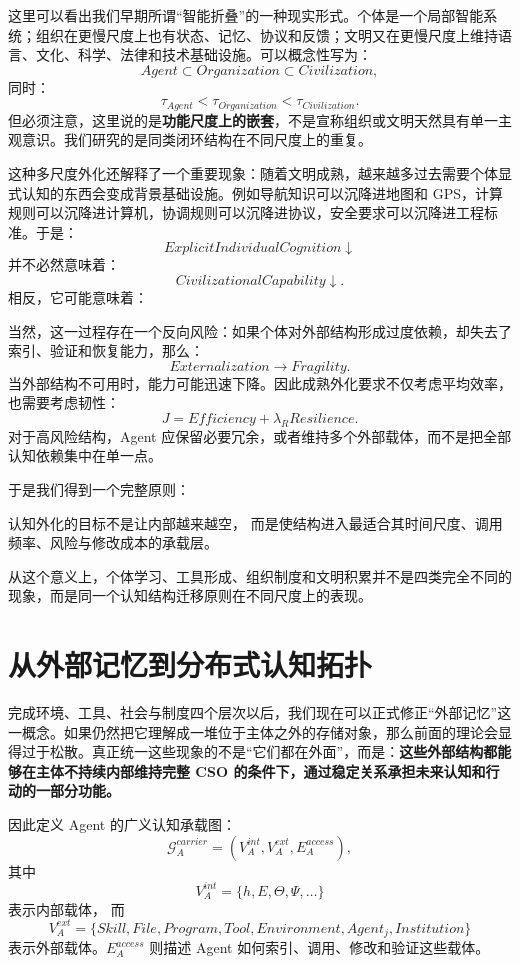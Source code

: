 这里可以看出我们早期所谓``智能折叠''的一种现实形式。个体是一个局部智能系统；组织在更慢尺度上也有状态、记忆、协议和反馈；文明又在更慢尺度上维持语言、文化、科学、法律和技术基础设施。可以概念性写为：
\[
Agent
\subset
Organization
\subset
Civilization,
\]
同时：
\[
\tau_{Agent}
<
\tau_{Organization}
<
\tau_{Civilization}.
\]
但必须注意，这里说的是\textbf{功能尺度上的嵌套}，不是宣称组织或文明天然具有单一主观意识。我们研究的是同类闭环结构在不同尺度上的重复。

这种多尺度外化还解释了一个重要现象：随着文明成熟，越来越多过去需要个体显式认知的东西会变成背景基础设施。例如导航知识可以沉降进地图和 GPS，计算规则可以沉降进计算机，协调规则可以沉降进协议，安全要求可以沉降进工程标准。于是：
\[
ExplicitIndividualCognition
\downarrow
\]
并不必然意味着：
\[
CivilizationalCapability
\downarrow.
\]
相反，它可能意味着：
\begin{statementbox}
\centering
{}
\end{statementbox}

当然，这一过程存在一个反向风险：如果个体对外部结构形成过度依赖，却失去了索引、验证和恢复能力，那么：
\[
Externalization
\rightarrow
Fragility.
\]
当外部结构不可用时，能力可能迅速下降。因此成熟外化要求不仅考虑平均效率，也需要考虑韧性：
\[
J
=
Efficiency
+
\lambda_R Resilience.
\]
对于高风险结构，Agent 应保留必要冗余，或者维持多个外部载体，而不是把全部认知依赖集中在单一点。

于是我们得到一个完整原则：
\begin{proposition*}
认知外化的目标不是让内部越来越空，
而是使结构进入最适合其时间尺度、调用频率、风险与修改成本的承载层。
\end{proposition*}
从这个意义上，个体学习、工具形成、组织制度和文明积累并不是四类完全不同的现象，而是同一个认知结构迁移原则在不同尺度上的表现。

\section{从外部记忆到分布式认知拓扑}

完成环境、工具、社会与制度四个层次以后，我们现在可以正式修正``外部记忆''这一概念。如果仍然把它理解成一堆位于主体之外的存储对象，那么前面的理论会显得过于松散。真正统一这些现象的不是``它们都在外面''，而是：\textbf{这些外部结构都能够在主体不持续内部维持完整 CSO 的条件下，通过稳定关系承担未来认知和行动的一部分功能。}

因此定义 Agent 的广义认知承载图：
\[
\mathcal G_A^{carrier}
=
(
V_A^{int},
V_A^{ext},
E_A^{access}
),
\]
其中
\[
V_A^{int}
=
\{h,E,\Theta,\Psi,\ldots\}
\]
表示内部载体，
而
\[
V_A^{ext}
=
\{
Skill,
File,
Program,
Tool,
Environment,
Agent_j,
Institution
\}
\]
表示外部载体。$E_A^{access}$ 则描述 Agent 如何索引、调用、修改和验证这些载体。

